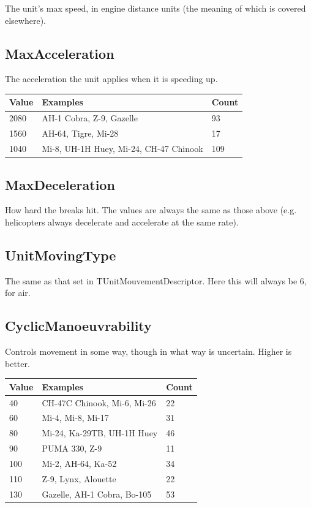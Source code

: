 \documentclass{article}
\begin{document}
The unit's max speed, in engine distance units (the meaning of which is covered elsewhere).

\subsection{MaxAcceleration}

The acceleration the unit applies when it is speeding up.

\begin{center}
    \begin{tabular}{ | l | l | l |}
    \hline
	Value & Examples & Count\\ \hline
	2080 & AH-1 Cobra, Z-9, Gazelle & 93\\
	1560 & AH-64, Tigre, Mi-28 & 17\\
	1040 & Mi-8, UH-1H Huey, Mi-24, CH-47 Chinook & 109\\
    \hline
    \end{tabular}
\end{center}

\subsection{MaxDeceleration}

How hard the breaks hit. The values are always the same as those above (e.g. helicopters always decelerate and accelerate at the same rate).

\subsection{UnitMovingType}

The same as that set in TUnitMouvementDescriptor. Here this will always be 6, for air.

\subsection{CyclicManoeuvrability}

Controls movement in some way, though in what way is uncertain. Higher is better.

\begin{center}
    \begin{tabular}{ | l | l | l |}
    \hline
	Value & Examples & Count\\ \hline
	40 & CH-47C Chinook, Mi-6, Mi-26 & 22\\
	60 & Mi-4, Mi-8, Mi-17 & 31\\
	80 & Mi-24, Ka-29TB, UH-1H Huey & 46\\
	90 & PUMA 330, Z-9 & 11\\
	100 & Mi-2, AH-64, Ka-52 & 34\\
	110 & Z-9, Lynx, Alouette & 22\\
	130 & Gazelle, AH-1 Cobra, Bo-105 & 53\\
    \hline
    \end{tabular}
\end{center}
\end{document}

